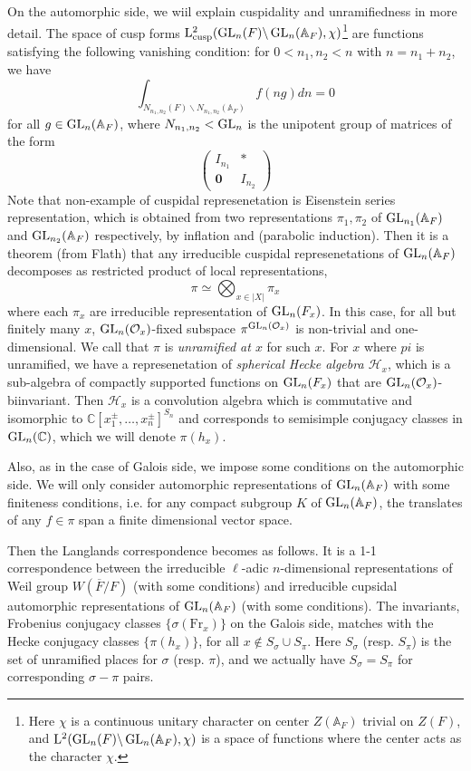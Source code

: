 On the automorphic side, we wiil explain cuspidality and unramifiedness in more detail.
The space of cusp forms $\mathrm{L}^{2}_{\operatorname{\mathrm{cusp}}}(\operatorname{\mathrm{GL}}_{n}(F) \backslash \operatorname{\mathrm{GL}}_{n}(\mathbb{A}_{F}), \chi)$\footnote{Here $\chi$ is a continuous unitary character on center $Z(\mathbb{A}_{F})$ trivial on $Z(F)$,
and $\mathrm{L}^{2}(\operatorname{\mathrm{GL}}_{n}(F)\backslash\operatorname{\mathrm{GL}}_{n}(\mathbb{A}_{F}), \chi)$ is a space of functions where the center acts as the character $\chi$.
}
are functions satisfying the following vanishing condition: for $0 < n_{1}, n_{2} < n$ with $n = n_{1} + n_{2}$,
we have
$$
\int_{N_{n_{1}, n_{2}}(F) \backslash N_{n_{1}, n_{2}}(\mathbb{A}_{F})} f(ng)dn = 0
$$
for all $g\in \operatorname{\mathrm{GL}}_{n}(\mathbb{A}_{F})$, where $N_{n_{1}, n_{2}} < \operatorname{\mathrm{GL}}_{n}$ is the unipotent group of matrices of the form
$$
\begin{pmatrix}
    I_{n_{1}} & * \\ \mathbf{0} & I_{n_2}
\end{pmatrix}
$$
Note that non-example of cuspidal represenetation is Eisenstein series representation, which is obtained from
two representations $\pi_{1}, \pi_{2}$ of $\operatorname{\mathrm{GL}}_{n_{1}}(\mathbb{A}_{F})$ and $\operatorname{\mathrm{GL}}_{n_2}(\mathbb{A}_F)$ respectively, by inflation and (parabolic induction).
Then it is a theorem (from Flath) that any irreducible cuspidal represenetations of $\operatorname{\mathrm{GL}}_{n}(\mathbb{A}_F)$ decomposes as restricted product
of local representations,
$$
\pi \simeq \bigotimes_{x\in |X|} \pi_{x}
$$
where each $\pi_{x}$ are irreducible representation of $\operatorname{\mathrm{GL}}_{n}(F_x)$.
In this case, for all but finitely many $x$, $\operatorname{\mathrm{GL}}_{n}(\mathcal{O}_{x})$-fixed subspace
$\pi^{\operatorname{\mathrm{GL}}_{n}(\mathcal{O}_x)}$ is non-trivial and one-dimensional.
We call that $\pi$ is \emph{unramified at $x$} for such $x$.
For $x$ where $pi$ is unramified, we have a represenetation of \emph{spherical Hecke algebra $\mathcal{H}_{x}$}, which 
is a sub-algebra of compactly supported functions on $\operatorname{\mathrm{GL}}_{n}(F_{x})$ that are $\operatorname{\mathrm{GL}}_{n}(\mathcal{O}_{x})$-biinvariant.
Then $\mathcal{H}_{x}$ is a convolution algebra which is commutative and 
isomorphic to $\mathbb{C}[x_{1}^{\pm}, \dots, x_{n}^{\pm}]^{S_{n}}$
and corresponds to semisimple conjugacy classes in $\operatorname{\mathrm{GL}}_{n}(\mathbb{C})$, which we will denote $\pi(h_{x})$.

Also, as in the case of Galois side, we impose some conditions on the automorphic side.
We will only consider automorphic representations of $\operatorname{\mathrm{GL}}_{n}(\mathbb{A}_{F})$ with some finiteness conditions, i.e.
for any compact subgroup $K$ of $\operatorname{\mathrm{GL}}_{n}(\mathbb{A}_F)$, the translates of any $f\in \pi$ span a
finite dimensional vector space.

Then the Langlands correspondence becomes as follows.
It is a 1-1 correspondence between the irreducible $\ell$-adic $n$-dimensional representations of Weil group $W(\overline{F}/F)$
(with some conditions) and irreducible cupsidal automorphic representations of $\operatorname{\mathrm{GL}}_{n}(\mathbb{A}_{F})$ (with some conditions).
The invariants, Frobenius conjugacy classes $\{\sigma(\mathrm{Fr}_{x})\}$ on the Galois side, matches with
the Hecke conjugacy classes $\{\pi(h_{x})\}$, for all $x \not \in S_{\sigma} \cup S_{\pi}$.
Here $S_{\sigma}$ (resp. $S_{\pi}$) is the set of unramified places for $\sigma$ (resp. $\pi$), and
we actually have $S_{\sigma} = S_{\pi}$ for corresponding $\sigma - \pi$ pairs.